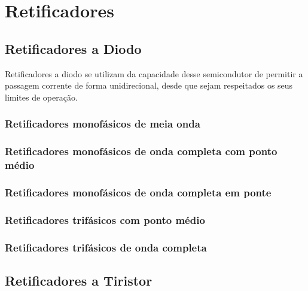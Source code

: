\section{Retificadores}



\subsection{Retificadores a Diodo}

Retificadores a diodo se utilizam da capacidade desse semicondutor de permitir a passagem corrente de forma unidirecional, desde que sejam respeitados os seus limites de operação.

\subsubsection{Retificadores monofásicos de meia onda}


 
\subsubsection{Retificadores monofásicos de onda completa com ponto médio}



\subsubsection{Retificadores monofásicos de onda completa em ponte}



\subsubsection{Retificadores trifásicos com ponto médio}
 

 
\subsubsection{Retificadores trifásicos de onda completa}



\subsection{Retificadores a Tiristor}

